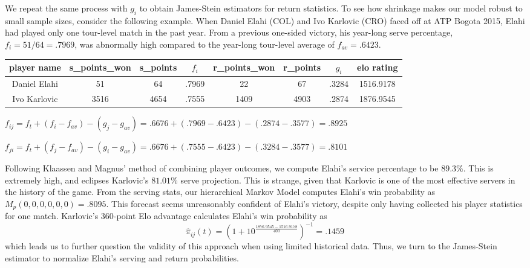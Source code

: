 \documentclass[chapterprefix=false]{report}
\begin{document}
We repeat the same process with $g_i$ to obtain James-Stein estimators for return statistics. To see how shrinkage makes our model robust to small sample sizes, consider the following example. When Daniel Elahi (COL) and Ivo Karlovic (CRO) faced off at ATP Bogota 2015, Elahi had played only one tour-level match in the past year. From a previous one-sided victory, his year-long serve percentage, $f_i=51/64=.7969$, was abnormally high compared to the year-long tour-level average of $f_{av}=.6423$. 


\begin{center}
\begin{tabular}{ |c|c|c|c|c|c|c|c| } 
 \hline
 player name & s\_points\_won & s\_points
 & $f_i$ & r\_points\_won & r\_points & $g_i$ & elo rating \\ 
 \hline
 Daniel Elahi & 51 & 64 & .7969 & 22 & 67 & .3284 & 1516.9178 
 \\
 \hline
 Ivo Karlovic & 3516 & 4654 & .7555 & 1409 & 4903 & .2874 & 1876.9545 \\ 
 \hline
\end{tabular}
\end{center}

\begin{center}
$f_{ij} = f_t + (f_i-f_{av})-(g_j-g_{av}) = .6676 + (.7969-.6423) - (.2874-.3577) = .8925$

$f_{ji} = f_t + (f_j-f_{av})-(g_i-g_{av}) = .6676 + (.7555-.6423) - (.3284-.3577) = .8101$
\end{center}

Following Klaassen and Magnus' method of combining player outcomes, we compute Elahi's service percentage to be $89.3\%$. This is extremely high, and eclipses Karlovic's $81.01\%$ serve projection. This is strange, given that Karlovic is one of the most effective servers in the history of the game. From the serving stats, our hierarchical Markov Model computes Elahi's win probability as $M_p(0,0,0,0,0,0) = .8095$. This forecast seems unreasonably confident of Elahi's victory, despite only having collected his player statistics for one match. Karlovic's 360-point Elo advantage calculates Elahi's win probability as $$\hat{\pi}_{ij}(t) = (1+10^\frac{1876.9545 - 1516.9178}{400})^{-1} = .1459$$ which leads us to further question the validity of this approach when using limited historical data. Thus, we turn to the James-Stein estimator to normalize Elahi's serving and return probabilities.
\end{document}

